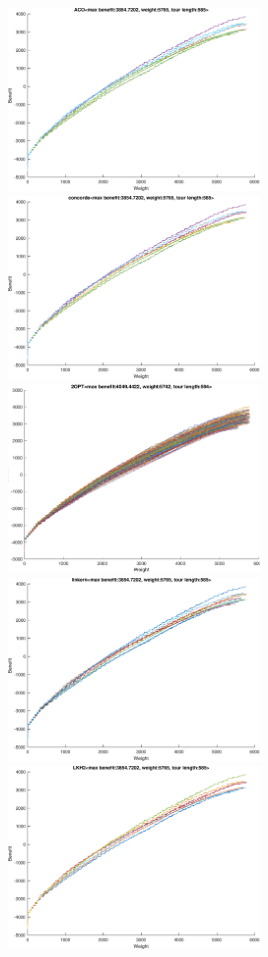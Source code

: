 \documentclass{article}
\begin{document}
\noindent
\includegraphics[width=0.5\textwidth]{eil76figs/eil76_n75_bounded-strongly-corr_01.ttp.aco.txt.eps}
\includegraphics[width=0.5\textwidth]{eil76figs/eil76_n75_bounded-strongly-corr_01.ttp.con.txt.eps}
\includegraphics[width=0.5\textwidth]{eil76figs/eil76_n75_bounded-strongly-corr_01.ttp.inv.txt.eps}
\includegraphics[width=0.5\textwidth]{eil76figs/eil76_n75_bounded-strongly-corr_01.ttp.lkh.txt.eps}
\includegraphics[width=0.5\textwidth]{eil76figs/eil76_n75_bounded-strongly-corr_01.ttp.lkh2.txt.eps}
\end{document}
